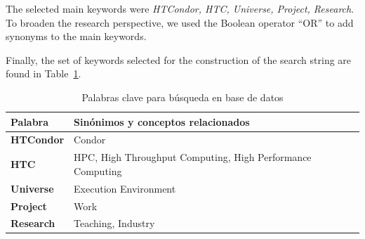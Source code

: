 The selected main keywords were \textit{HTCondor, HTC, Universe, Project, Research}. To broaden the research perspective, we used the Boolean operator ``OR'' to add synonyms to the main keywords.

Finally, the set of keywords selected for the construction of the search string are found in Table~\ref{table:database_search_keywords}.


\begin{table}[htbp]
	\centering
	\caption{Palabras clave para búsqueda en base de datos}
	\label{table:database_search_keywords}
	\renewcommand{\arraystretch}{1}  %
	\begin{tabular}{p{1.4cm}p{6.4cm}}
		\toprule
		\textbf{Palabra}  & \textbf{Sinónimos y conceptos relacionados}                \\
		\midrule
		\textbf{HTCondor} & Condor                                                     \\
		\addlinespace[0.8em]
		\textbf{HTC}      & HPC, High Throughput Computing, High Performance Computing \\
		\addlinespace[0.8em]
		\textbf{Universe} & Execution Environment                                      \\
		\addlinespace[0.8em]
		\textbf{Project}  & Work                                                       \\
		\addlinespace[0.8em]
		\textbf{Research} & Teaching, Industry                                         \\
		\bottomrule
	\end{tabular}
\end{table}





